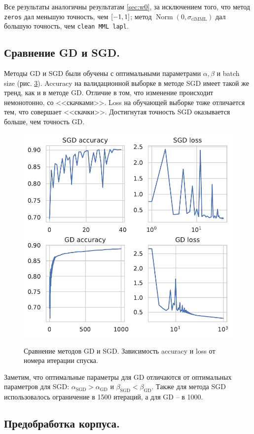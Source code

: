\documentclass[12pt]{extarticle}
\DeclareMathOperator{\N}{\text{Norm}}
\let\U\relax
\DeclareMathOperator{\U}{\text{Uniform}}
\begin{document}
\begin{figure}[!htb]
\begin{subfigure}[t]{0.48\linewidth}
        \label{fig:sgd_init_weights_loss}
     \end{subfigure}
     \label{fig:init_weights_stoch}
\end{figure}

Все результаты аналогичны результатам \ref{sec:w0}, за исключением того, что метод \texttt{zeros} дал меньшую точность, чем $\U[-1,1]$; метод $\N(0,\sigma_\text{clMML})$ дал большую точность, чем \texttt{clean MML lapl}.

\subsection{Сравнение GD и SGD.}

Методы GD и SGD были обучены с оптимальными параметрами $\alpha,\beta$ и batch size (рис. \ref{fig:gd_sgd}). Accuracy на валидационной выборке в методе SGD имеет такой же тренд, как и в методе GD. Отличие в том, что изменение происходит немонотонно, со <<скачками>>. Loss на обучающей выборке тоже отличается тем, что совершает <<скачки>>. Достигнутая точность SGD оказывается больше, чем точность GD.

\begin{figure}[!htb]
    \centering
    \caption{Сравнение методов GD и SGD. Зависимость accuracy и loss от номера итерации спуска.}
    \includegraphics[width=0.6\linewidth]{pics/gd_sgd.pdf}
    \label{fig:gd_sgd}
\end{figure}

Заметим, что оптимальные параметры для GD отличаются от оптимальных параметров для SGD: $\alpha_\text{SGD}>\alpha_\text{GD}$ и $\beta_\text{SGD}<\beta_\text{GD}$. Также для метода SGD использовалось ограничение в 1500 итераций, а для GD -- в 1000. 

\subsection{Предобработка корпуса.}
\end{document}
